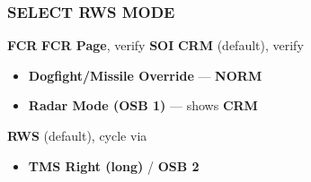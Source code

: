 \subsubsection{SELECT RWS MODE}
\begin{checklistenumerate}
     \textbf{FCR}
     \textbf{FCR Page}, verify \textbf{SOI}
        \textbf{CRM} (default), verify

        \begin{itemize}
            \item \textbf{Dogfight/Missile Override} --- \textbf{NORM}
            \item \textbf{Radar Mode (OSB 1)} --- shows \textbf{CRM}
        \end{itemize}
        \textbf{RWS} (default), cycle via 

        \begin{itemize}
            \item \textbf{TMS Right (long)} / \textbf{OSB 2} 
        \end{itemize}
\end{checklistenumerate}

